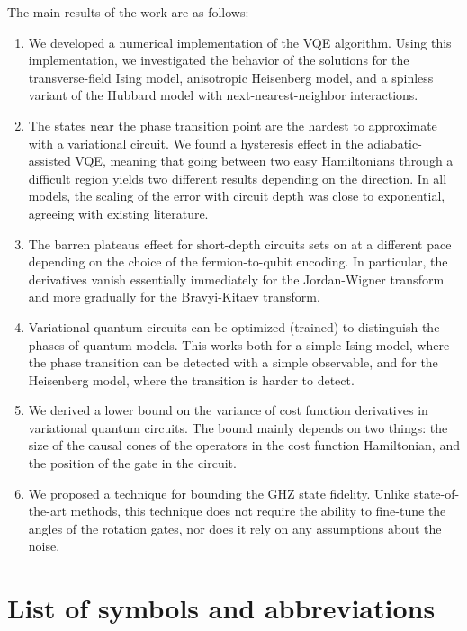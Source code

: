 The main results of the work are as follows:
\begin{enumerate}
    \item We developed a numerical implementation of the VQE algorithm. Using this implementation, we investigated the behavior of the solutions for the transverse-field Ising model, anisotropic Heisenberg model, and a spinless variant of the Hubbard model with next-nearest-neighbor interactions. 
    \item The states near the phase transition point are the hardest to approximate with a variational circuit. We found a hysteresis effect in the adiabatic-assisted VQE, meaning that going between two easy Hamiltonians through a difficult region yields two different results depending on the direction. In all models, the scaling of the error with circuit depth was close to exponential, agreeing with existing literature.
    \item The barren plateaus effect for short-depth circuits sets on at a different pace depending on the choice of the fermion-to-qubit encoding. In particular, the derivatives vanish essentially immediately for the Jordan-Wigner transform and more gradually for the Bravyi-Kitaev transform.
    \item Variational quantum circuits can be optimized (trained) to distinguish the phases of quantum models. This works both for a simple Ising model, where the phase transition can be detected with a simple observable, and for the Heisenberg model, where the transition is harder to detect.
    \item We derived a lower bound on the variance of cost function derivatives in variational quantum circuits. The bound mainly depends on two things: the size of the causal cones of the operators in the cost function Hamiltonian, and the position of the gate in the circuit.
    \item We proposed a technique for bounding the GHZ state fidelity. Unlike state-of-the-art methods, this technique does not require the ability to fine-tune the angles of the rotation gates, nor does it rely on any assumptions about the noise.
\end{enumerate}

\chapter*{List of symbols and abbreviations}

